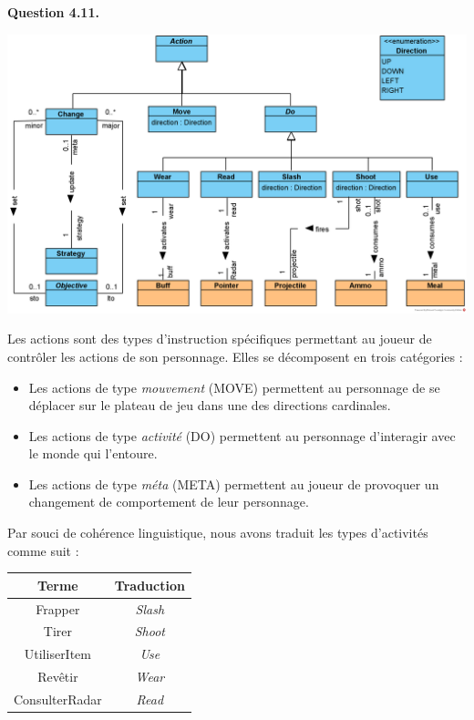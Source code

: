 \documentclass[oneside,a4paper]{book}
\begin{document}
\textbf{Question 4.11.}\label{Question 4.11.}\newline

\nopagebreak 

\includegraphics[width=\textwidth,height=\textheight,keepaspectratio]{Diagrams/DS-Action.png}

Les actions sont des types d'instruction spécifiques permettant au joueur de contrôler les actions de son personnage.
Elles se décomposent en trois catégories :
\begin{itemize}
    \item Les actions de type \textit{mouvement} (MOVE) permettent au personnage de se déplacer sur le plateau de jeu dans une des directions cardinales.
    \item Les actions de type \textit{activité} (DO) permettent au personnage d'interagir avec le monde qui l'entoure.
    \item Les actions de type \textit{méta} (META) permettent au joueur de provoquer un changement de comportement de leur personnage.
\end{itemize}

Par souci de cohérence linguistique, nous avons traduit les types d'activités comme suit :
\begin{center}
\begin{tabular}{c|c}
      \textbf{Terme} & \textbf{Traduction} \\\hline\hline
      Frapper & \textit{Slash}\\
      Tirer & \textit{Shoot}\\
      UtiliserItem & \textit{Use}\\
      Revêtir & \textit{Wear}\\
      ConsulterRadar & \textit{Read}\\
\end{tabular}
\end{center}
\end{document}
